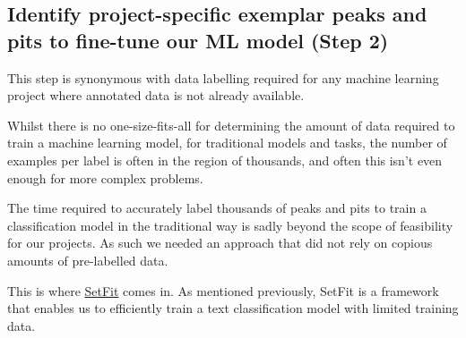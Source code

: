 \documentclass[
  letterpaper,
  DIV=11,
  numbers=noendperiod]{scrreprt}
\begin{document}
\subsection{Identify project-specific exemplar peaks and pits to
fine-tune our ML model (Step 2)}\label{step-two}

This step is synonymous with data labelling required for any machine
learning project where annotated data is not already available.

Whilst there is no one-size-fits-all for determining the amount of data
required to train a machine learning model, for traditional models and
tasks, the number of examples per label is often in the region of
thousands, and often this isn't even enough for more complex problems.

The time required to accurately label thousands of peaks and pits to
train a classification model in the traditional way is sadly beyond the
scope of feasibility for our projects. As such we needed an approach
that did not rely on copious amounts of pre-labelled data.

This is where
\href{https://huggingface.co/docs/setfit/conceptual_guides/setfit}{SetFit}
comes in. As mentioned previously, SetFit is a framework that enables us
to efficiently train a text classification model with limited training
data.
\end{document}
